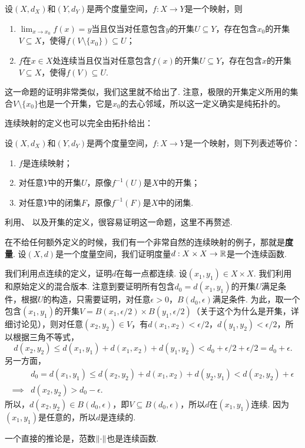 \begin{proposition}\label{prop:continuous-open}
    设$(X,d_X)$和$(Y,d_Y)$是两个度量空间，$f:X\to Y$是一个映射，则
\begin{enumerate}
    \item $\lim_{x\to x_0} f(x)=y$当且仅当对任意包含$y$的开集$U\subseteq Y$，存在包含$x_0$的开集$V\subseteq X$，使得$f(V\setminus\{x_0\})\subseteq U$；
    \item  $f$在$x\in X$处连续当且仅当对任意包含$f(x)$的开集$U\subseteq Y$，存在包含$x$的开集$V\subseteq X$，使得$f(V)\subseteq U$.
\end{enumerate}
\end{proposition}

这一命题的证明非常类似，我们这里就不给出了. 注意，极限的开集定义所用的集合$V\setminus\{x_0\}$也是一个开集，它是$x_0$的去心邻域，所以这一定义确实是纯拓扑的。

连续映射的定义也可以完全由拓扑给出：

\begin{proposition}\label{prop:continuous-topology}
    设$(X,d_X)$和$(Y,d_Y)$是两个度量空间，$f:X\to Y$是一个映射，则下列表述等价：
    \begin{enumerate}
        \item $f$是连续映射；
        \item 对任意$Y$中的开集$U$，原像$f^{-1}(U)$是$X$中的开集；
        \item 对任意$Y$中的闭集$F$，原像$f^{-1}(F)$是$X$中的闭集. 
    \end{enumerate}
\end{proposition}

利用、 以及开集的定义，很容易证明这一命题，这里不再赘述. 

\begin{example}\label{ex:metric-norm-continuous}
在不给任何额外定义的时候，我们有一个非常自然的连续映射的例子，那就是\textbf{度量}. 设$(X,d)$是一个度量空间，我们证明度量$d:X\times X\to\mathbb{R}$是一个连续函数. 

我们利用点连续的定义，证明$d$在每一点都连续. 设$(x_1,y_1)\in X\times X$. 我们利用 和原始定义的混合版本. 注意到要证明所有包含$d_0=d(x_1,y_1)$的开集$U$满足条件，根据$U$的构造，只需要证明，对任意$\epsilon>0$，$B(d_0,\epsilon)$满足条件. 为此，取一个包含$(x_1,y_1)$的开集$V=B(x_1,\epsilon/2)\times B(y_1,\epsilon/2)$（关于这个为什么是开集，详细讨论见），则对任意$(x_2,y_2)\in V$，有$d(x_1,x_2)<\epsilon/2$，$d(y_1,y_2)<\epsilon/2$，所以根据三角不等式，
\[d(x_2,y_2)\leq d(x_1,y_1)+d(x_1,x_2)+d(y_1,y_2)<d_0+\epsilon/2+\epsilon/2=d_0+\epsilon.\]
另一方面，
\begin{align*}
    &d_0=d(x_1,y_1)\leq d(x_2,y_2)+d(x_1,x_2)+d(y_2,y_1)<d(x_2,y_2)+\epsilon\\
\implies& d(x_2,y_2)>d_0-\epsilon.
\end{align*}
所以，$d(x_2,y_2)\in B(d_0,\epsilon)$，即$V\subseteq B(d_0,\epsilon)$，所以$d$在$(x_1,y_1)$连续. 因为$(x_1,y_1)$是任意的，所以$d$是连续的.

一个直接的推论是，范数$\left\|\cdot\right\|$也是连续函数. 
\end{example}

